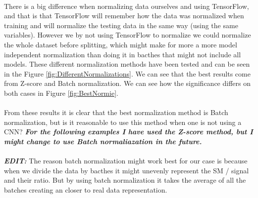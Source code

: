\documentclass[14pt, a4paper]{book}
\begin{document}
\\There is a big difference when normalizing data ourselves and using TensorFlow, and that is that TensorFlow will remember how the data was normalized when training and will normalize the testing data in the same way (using the same variables). However we by not using TensorFlow to normalize we could normalize the whole dataset before splitting, which might make for more a more model independent normalization than doing it in bacthes that might not include all models.
These different normalization methods have been tested and can be seen in the Figure \ref{fig:DifferentNormalizations}. 
We can see that the best results come from Z-score and Batch normalization. We can see how the significance differs on both cases in Figure \ref{fig:BestNormie}.\\
\\From these results it is clear that the best normalization method is Batch normalization, but is it reasonable to use this method when one is not using a CNN? \textit{\textbf{For the following examples I have used the Z-score method, but I might change to use Batch normaliazation in the future.}}\\
\\\textit{\textbf{EDIT:}} The reason batch normalization might work best for our case is because when we divide the data by bacthes it might unevenly represent the SM / signal and their ratio. But by using batch normalization it  takes the average of all the batches creating an closer to real data representation. 
\graphicspath{{../../../Plots/TESTING/NeuralNetwork/NORMALIZATIONS/}}
\end{document}
